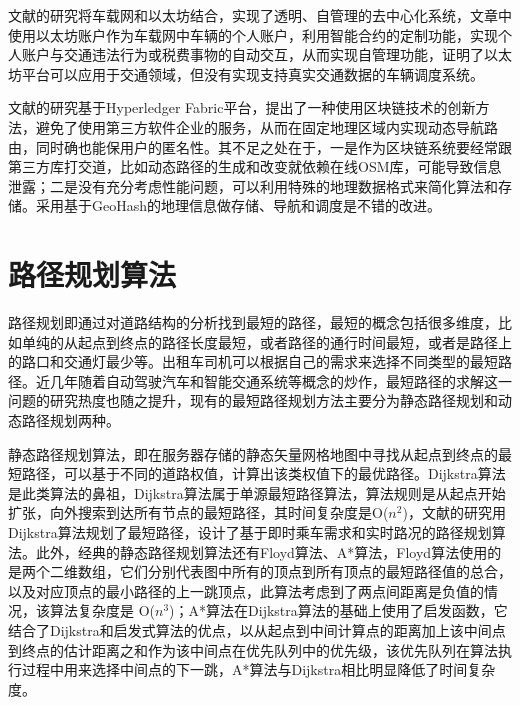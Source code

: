 文献的研究将车载网和以太坊结合，实现了透明、自管理的去中心化系统，文章中使用以太坊账户作为车载网中车辆的个人账户，利用智能合约的定制功能，实现个人账户与交通违法行为或税费事物的自动交互，从而实现自管理功能，证明了以太坊平台可以应用于交通领域，但没有实现支持真实交通数据的车辆调度系统。\par

文献的研究基于Hyperledger Fabric平台，提出了一种使用区块链技术的创新方法，避免了使用第三方软件企业的服务，从而在固定地理区域内实现动态导航路由，同时确也能保用户的匿名性。其不足之处在于，一是作为区块链系统要经常跟第三方库打交道，比如动态路径的生成和改变就依赖在线OSM库，可能导致信息泄露；二是没有充分考虑性能问题，可以利用特殊的地理数据格式来简化算法和存储。采用基于GeoHash的地理信息做存储、导航和调度是不错的改进。

\section{路径规划算法}
路径规划即通过对道路结构的分析找到最短的路径，最短的概念包括很多维度，比如单纯的从起点到终点的路径长度最短，或者路径的通行时间最短，或者是路径上的路口和交通灯最少等。出租车司机可以根据自己的需求来选择不同类型的最短路径。近几年随着自动驾驶汽车和智能交通系统等概念的炒作，最短路径的求解这一问题的研究热度也随之提升，现有的最短路径规划方法主要分为静态路径规划和动态路径规划两种。\par
静态路径规划算法，即在服务器存储的静态矢量网格地图中寻找从起点到终点的最短路径，可以基于不同的道路权值，计算出该类权值下的最优路径。Dijkstra算法是此类算法的鼻祖，Dijkstra算法属于单源最短路径算法，算法规则是从起点开始扩张，向外搜索到达所有节点的最短路径，其时间复杂度是O($ n^{2} $)，文献的研究用Dijkstra算法规划了最短路径，设计了基于即时乘车需求和实时路况的路径规划算法。此外，经典的静态路径规划算法还有Floyd算法、A*算法，Floyd算法使用的是两个二维数组，它们分别代表图中所有的顶点到所有顶点的最短路径值的总合，以及对应顶点的最小路径的上一跳顶点，此算法考虑到了两点间距离是负值的情况，该算法复杂度是 O($ n^{3} $)；A*算法在Dijkstra算法的基础上使用了启发函数，它结合了Dijkstra和启发式算法的优点，以从起点到中间计算点的距离加上该中间点到终点的估计距离之和作为该中间点在优先队列中的优先级，该优先队列在算法执行过程中用来选择中间点的下一跳，A*算法与Dijkstra相比明显降低了时间复杂度。\par
